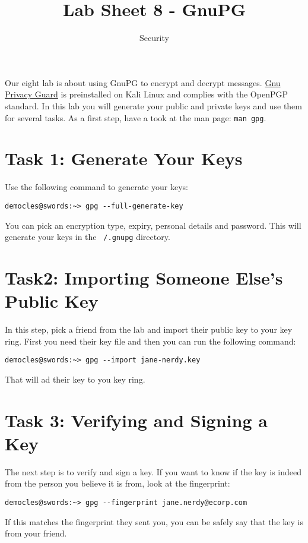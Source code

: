 \documentclass{article}
\title{Lab Sheet 8 - GnuPG}
\date{Security}
\begin{document}
\maketitle
Our eight lab is about using GnuPG to encrypt and decrypt messages. \href{https://linux.die.net/man/1/gpg}{Gnu Privacy Guard} is preinstalled on Kali Linux and complies with the OpenPGP standard. In this lab you will generate your public and private keys and use them for several tasks. As a first step, have a took at the man page: \texttt{man gpg}.

\section{Task 1: Generate Your Keys}
Use the following command to generate your keys:
\begin{verbatim}
democles@swords:~> gpg --full-generate-key
\end{verbatim}

You can pick an encryption type, expiry, personal details and password. This will generate your keys in the \texttt{~/.gnupg} directory.

\section{Task2: Importing Someone Else's Public Key}
In this step, pick a friend from the lab and import their public key to your key ring. First you need their key file and then you can run the following command:

\begin{verbatim}
democles@swords:~> gpg --import jane-nerdy.key
\end{verbatim}

That will ad their key to you key ring.

\section{Task 3: Verifying and Signing a Key}
The next step is to verify and sign a key. If you want to know if the key is indeed from the person you believe it is from, look at the fingerprint:

\begin{verbatim}
democles@swords:~> gpg --fingerprint jane.nerdy@ecorp.com
\end{verbatim}

If this matches the fingerprint they sent you, you can be safely say that the key is from your friend.
\end{document}
